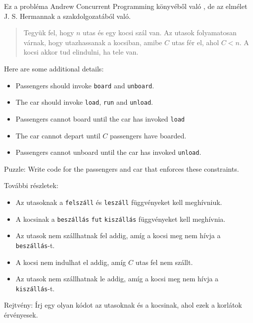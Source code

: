 \documentclass{book}
\begin{document}
Ez a probléma Andrew Concurrent Programming könyvéből való \cite{andrews},
de az elmélet J. S. Hermannak a szakdolgozatából való.

\begin{quotation}
Tegyük fel, hogy $n$ utas és egy kocsi szál van. Az utasok folyamatosan várnak, hogy
utazhassanak a kocsiban, amibe $C$ utas fér el, ahol $C<n$. A kocsi akkor tud elindulni, ha
tele van.
\end{quotation}

Here are some additional details:

\begin{itemize}

\item Passengers should invoke {\tt board} and {\tt unboard}.

\item The car should invoke {\tt load}, {\tt run} and {\tt unload}.

\item Passengers cannot board until the car has invoked {\tt load}

\item The car cannot depart until $C$ passengers have boarded.

\item Passengers cannot unboard until the car
has invoked {\tt unload}.

\end{itemize}

Puzzle: Write code for the passengers and car that enforces these
constraints.

További részletek:

\begin{itemize}

\item Az utasoknak a {\tt felszáll} és {\tt leszáll} függvényeket kell meghívniuk.
\item A kocsinak a {\tt beszállás} {\tt fut} {\tt kiszállás} függvényeket kell meghívnia.
\item Az utasok nem szállhatnak fel addig, amíg a kocsi meg nem hívja a {\tt beszállás}-t.
\item A kocsi nem indulhat el addig, amíg $C$ utas fel nem szállt.
\item Az utasok nem szállhatnak le addig, amíg a kocsi meg nem hívja a {\tt kiszállás}-t.

\end{itemize}

Rejtvény: Írj egy olyan kódot az utasoknak és a kocsinak, ahol ezek a korlátok érvényesek.
\end{document}
